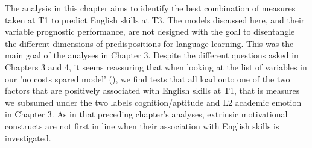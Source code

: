 \documentclass[output=paper]{langsci/langscibook}
\begin{document}
The analysis in this chapter aims to identify the best combination of measures taken at T1 to predict English skills at T3. The models discussed here, and their variable prognostic performance, are not designed with the goal to disentangle the different dimensions of predispositions for language learning. This was the main goal of the analyses in Chapter 3. Despite the different questions asked in Chapters 3 and 4, it seems reassuring that when looking at the list of variables in our 'no costs spared model' (), we find tests that all load onto one of the two factors that are positively associated with English skills at T1, that is measures we subsumed under the two labels cognition/aptitude and L2 academic emotion in Chapter 3. As in that preceding chapter’s analyses, extrinsic motivational constructs are not first in line when their association with English skills is investigated. 

{\sloppy\printbibliography[heading=subbibliography,notkeyword=this]}
\end{document}
